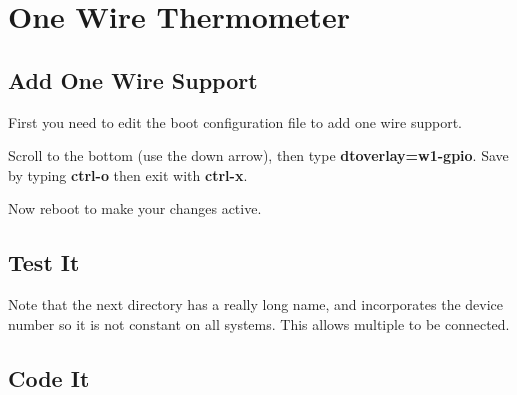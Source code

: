 \chapter{One Wire Thermometer}

\section{Add One Wire Support}

First you need to edit the boot configuration file to add one wire support.


Scroll to the bottom (use the down arrow), then type \textbf{dtoverlay=w1-gpio}.
Save by typing \textbf{ctrl-o} then exit with \textbf{ctrl-x}.

Now reboot to make your changes active.



\section{Test It}








Note that the next directory has a really long name, and incorporates the device number so it is not constant on all systems.  This allows multiple to be connected.





\section{Code It}

